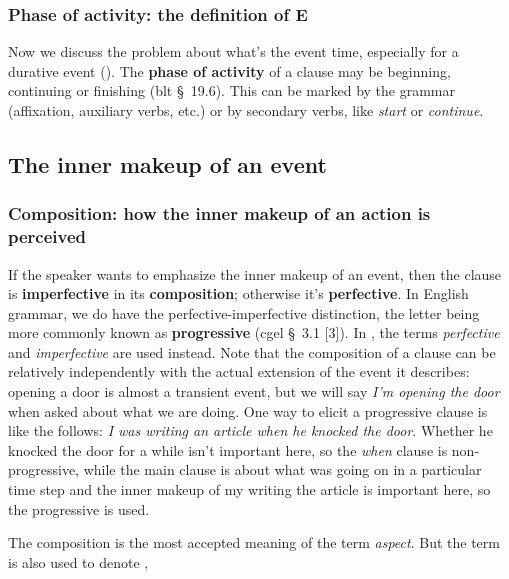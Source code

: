 \documentclass[UTF8, a4paper, oneside, scheme=plain]{ctexart}
\newcommand*{\citesec}[1]{\S~{#1}}
\newcommand*{\concept}[1]{\textbf{#1}}
\newcommand*{\term}[1]{\emph{#1}}
\newcommand*{\corpus}[1]{\emph{#1}}
\begin{document}
\subsubsection{Phase of activity: the definition of E}\label{sec:phase-of-activity}

Now we discuss the problem about what's the event time,
especially for a durative event ().
The \concept{phase of activity} of a clause 
may be beginning, continuing or finishing (\ac{blt} \citesec{19.6}).
This can be marked by the grammar (affixation, auxiliary verbs, etc.) 
or by secondary verbs,
like \corpus{start} or \corpus{continue}.

\subsection{The inner makeup of an event}\label{sec:inner-make-up-event}

\subsubsection{Composition: how the inner makeup of an action is perceived}\label{sec:composition}

If the speaker wants to emphasize the inner makeup of an event,
then the clause is \concept{imperfective} in its \concept{composition};
otherwise it's \concept{perfective}.
In English grammar, 
we do have the perfective-imperfective distinction,
the letter being more commonly known as \concept{progressive}
(\ac{cgel} \citesec{3.1} [3]).
In \cite[\citesec{2.2.3}]{dixon2005semantic},
the terms \term{perfective} and \term{imperfective} are used instead.
Note that the composition of a clause can be relatively independently 
with the actual extension of the event it describes:
opening a door is almost a transient event,
but we will say \corpus{I'm opening the door} when asked about what we are doing.
One way to elicit a progressive clause is like the follows:
\corpus{I was writing an article when he knocked the door}.
Whether he knocked the door for a while isn't important here,
so the \corpus{when} clause is non-progressive,
while the main clause is about what was going on in a particular time step
and the inner makeup of my writing the article is important here,
so the progressive is used.

The composition is the most accepted meaning of the term \term{aspect}.
But the term is also used to denote 
, 
\end{document}
